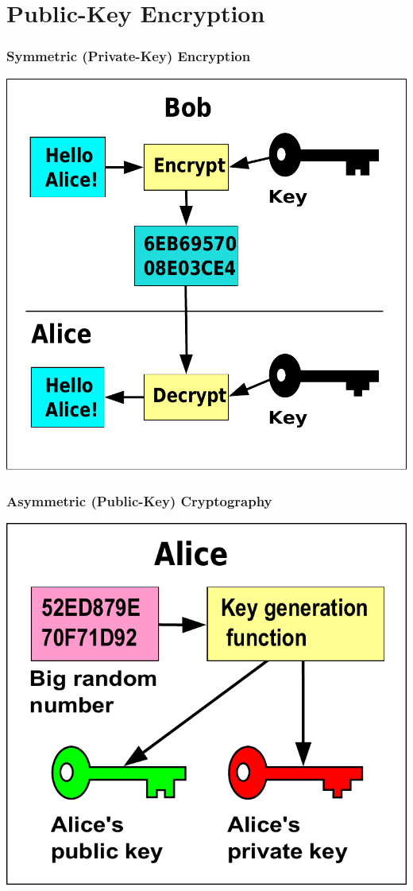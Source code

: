 \documentclass{beamer}
\begin{document}
\section{Public-Key Encryption}

\begin{frame}
  \frametitle{Symmetric (Private-Key) Encryption}

\includegraphics[height=0.5\textheight]{Symmetric_encryption}

\end{frame}

\begin{frame}
  \frametitle{Asymmetric (Public-Key) Cryptography}

\includegraphics[height=0.5\textheight]{Public_key_making}

\end{frame}
\end{document}

